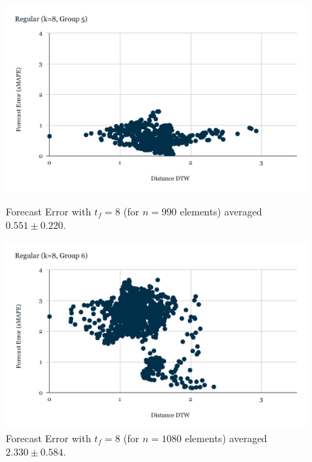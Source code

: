 \begin{figure}[!htbp]
  \centering
  \begin{minipage}[b]{0.45\textwidth}
    \includegraphics[width=\textwidth]{../Figures/distDTW_ForecastError_r8_c5}
    \caption{Forecast Error with $t_{f}=8$ (for $n=990$ elements) averaged $0.551 \pm 0.220$.}
    \label{Fig:DTWsMAPE_r8_g5}
  \end{minipage}
  \hfill
  \begin{minipage}[b]{0.45\textwidth}
    \includegraphics[width=\textwidth]{../Figures/distDTW_ForecastError_r8_c6}
    \caption{Forecast Error with $t_{f}=8$ (for $n=1080$ elements) averaged $2.330 \pm 0.584$.}
    \label{Fig:DTWsMAPE_r8_g64}
  \end{minipage}


\end{figure}
